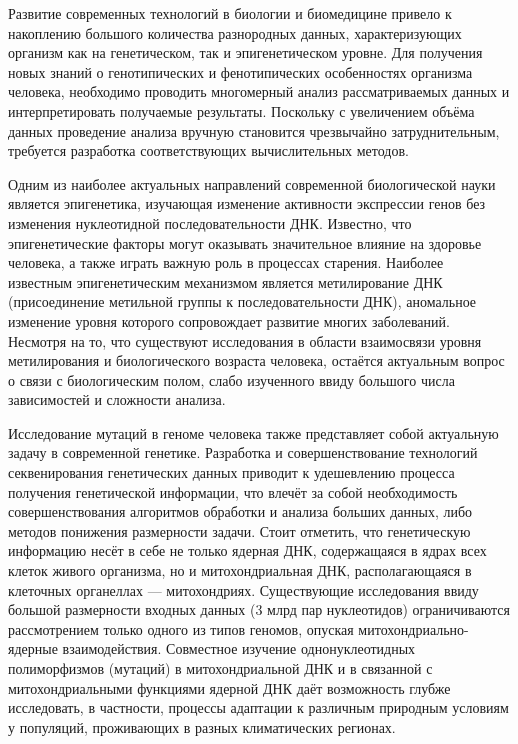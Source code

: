 
{\actuality}
Развитие современных технологий в биологии и биомедицине привело к накоплению большого количества разнородных данных, характеризующих организм как на генетическом, так и эпигенетическом уровне. Для получения новых знаний о генотипических и фенотипических особенностях организма человека, необходимо проводить многомерный анализ рассматриваемых данных и интерпретировать получаемые результаты.  Поскольку с увеличением объёма данных проведение анализа вручную становится чрезвычайно затруднительным, требуется разработка соответствующих вычислительных методов. 

Одним из наиболее актуальных направлений современной биологической науки является эпигенетика, изучающая изменение активности экспрессии генов без изменения нуклеотидной последовательности ДНК. Известно, что эпигенетические факторы могут оказывать значительное влияние на здоровье человека, а также играть важную роль в процессах старения. Наиболее известным эпигенетическим механизмом является метилирование ДНК (присоединение метильной группы к последовательности ДНК), аномальное изменение уровня которого сопровождает развитие многих заболеваний. Несмотря на то, что существуют исследования в области взаимосвязи уровня метилирования и биологического возраста человека, остаётся актуальным вопрос о связи с биологическим полом, слабо изученного ввиду большого числа зависимостей и сложности анализа. 

Исследование мутаций в геноме человека также представляет собой актуальную задачу в современной генетике. Разработка и совершенствование технологий секвенирования генетических данных приводит к удешевлению процесса получения генетической информации, что влечёт за собой необходимость совершенствования алгоритмов обработки и анализа больших данных, либо методов понижения размерности задачи. Стоит отметить, что генетическую информацию несёт в себе не только ядерная ДНК, содержащаяся в ядрах всех клеток живого организма, но и митохондриальная ДНК, располагающаяся в клеточных органеллах --- митохондриях. Существующие исследования ввиду большой размерности входных данных (3 млрд пар нуклеотидов) ограничиваются рассмотрением только одного из типов геномов, опуская митохондриально-ядерные взаимодействия. Совместное изучение однонуклеотидных полиморфизмов (мутаций) в митохондриальной ДНК и в связанной с митохондриальными функциями ядерной ДНК даёт возможность глубже исследовать, в частности, процессы адаптации к различным природным условиям у популяций, проживающих в разных климатических регионах.

